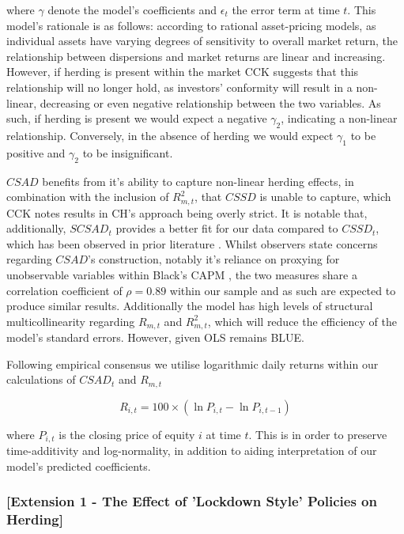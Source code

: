 \documentclass[12pt]{article}
\numberwithin{table}{section}   %
\begin{document}
where $\gamma$ denote the model’s coefficients and $\epsilon_t$ the error term at time $t$. This model’s rationale is as follows: according to rational asset-pricing models, as individual assets have varying degrees of sensitivity to overall market return, the relationship between dispersions and market returns are linear and increasing. However, if herding is present within the market CCK suggests that this relationship will no longer hold, as investors’ conformity will result in a non-linear, decreasing or even negative relationship between the two variables. As such, if herding is present we would expect a negative $\gamma_2$, indicating a non-linear relationship. Conversely, in the absence of herding we would expect $\gamma_1$ to be positive and $\gamma_2$ to be insignificant.

$CSAD$ benefits from it’s ability to capture non-linear herding effects, in combination with the inclusion of $R_{m,t}^2$, that $CSSD$ is unable to capture, which CCK notes results in CH’s approach being overly strict. It is notable that, additionally, $SCSAD_t$ provides a better fit for our data compared to $CSSD_t$, which has been observed in prior literature \citep{gleason}. Whilst observers state concerns regarding $CSAD$’s construction, notably it’s reliance on proxying for unobservable variables within Black’s CAPM \citep{yao, tan}, the two measures share a correlation coefficient of $\rho=0.89$ within our sample and as such are expected to produce similar results. Additionally the model has high levels of structural multicollinearity regarding $R_{m,t}$ and $R_{m,t}^2$, which will reduce the efficiency of the model's standard errors. However, given OLS remains BLUE.

Following empirical consensus \citep{yao, tan, chiang} we utilise logarithmic daily returns within our calculations of $CSAD_t$ and $R_{m,t}$

$$
R_{i,t}=100\times(\ln{P_{i,t}}-\ln{P_{i,t-1}})
$$

where $P_{i,t}$ is the closing price of equity $i$ at time $t$. This is in order to preserve time-additivity and log-normality, in addition to aiding interpretation of our model’s predicted coefficients.

\subsubsection*{[Extension 1 - The Effect of 'Lockdown Style' Policies on Herding]}
\end{document}
